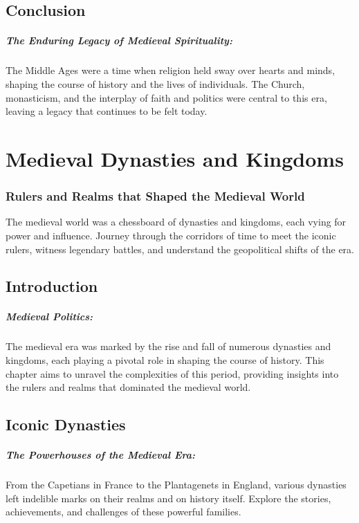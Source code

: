 \documentclass[a4paper,12pt]{book}
\begin{document}
\section*{Conclusion}

\paragraph{The Enduring Legacy of Medieval Spirituality:}
The Middle Ages were a time when religion held sway over hearts and minds, shaping the course of history and the lives of individuals. The Church, monasticism, and the interplay of faith and politics were central to this era, leaving a legacy that continues to be felt today.

\chapter{Medieval Dynasties and Kingdoms}
\subsection*{Rulers and Realms that Shaped the Medieval World}
The medieval world was a chessboard of dynasties and kingdoms, each vying for power and influence. Journey through the corridors of time to meet the iconic rulers, witness legendary battles, and understand the geopolitical shifts of the era.

\section*{Introduction}

\paragraph{Medieval Politics:}
The medieval era was marked by the rise and fall of numerous dynasties and kingdoms, each playing a pivotal role in shaping the course of history. This chapter aims to unravel the complexities of this period, providing insights into the rulers and realms that dominated the medieval world.

\section*{Iconic Dynasties}

\paragraph{The Powerhouses of the Medieval Era:}
From the Capetians in France to the Plantagenets in England, various dynasties left indelible marks on their realms and on history itself. Explore the stories, achievements, and challenges of these powerful families.
\end{document}
